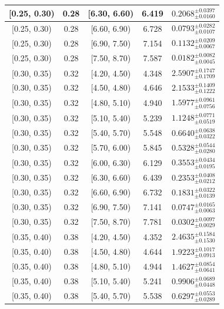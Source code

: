 \begin{longtable}{|c|c|c|c|c|}
\hline
[0.25, 0.30) & 0.28 & [6.30, 6.60) & 6.419 & $0.2068^{ \pm 0.0397 }_{ \pm 0.0160 }$ \\ 
\hline
[0.25, 0.30) & 0.28 & [6.60, 6.90) & 6.728 & $0.0793^{ \pm 0.0282 }_{ \pm 0.0107 }$ \\ 
\hline
[0.25, 0.30) & 0.28 & [6.90, 7.50) & 7.154 & $0.1132^{ \pm 0.0209 }_{ \pm 0.0067 }$ \\ 
\hline
[0.25, 0.30) & 0.28 & [7.50, 8.70) & 7.587 & $0.0182^{ \pm 0.0082 }_{ \pm 0.0045 }$ \\ 
\hline
[0.30, 0.35) & 0.32 & [4.20, 4.50) & 4.348 & $2.5907^{ \pm 0.1747 }_{ \pm 0.1709 }$ \\ 
\hline
[0.30, 0.35) & 0.32 & [4.50, 4.80) & 4.646 & $2.1533^{ \pm 0.1409 }_{ \pm 0.1222 }$ \\ 
\hline
[0.30, 0.35) & 0.32 & [4.80, 5.10) & 4.940 & $1.5977^{ \pm 0.0961 }_{ \pm 0.0756 }$ \\ 
\hline
[0.30, 0.35) & 0.32 & [5.10, 5.40) & 5.239 & $1.1248^{ \pm 0.0771 }_{ \pm 0.0519 }$ \\ 
\hline
[0.30, 0.35) & 0.32 & [5.40, 5.70) & 5.548 & $0.6640^{ \pm 0.0638 }_{ \pm 0.0322 }$ \\ 
\hline
[0.30, 0.35) & 0.32 & [5.70, 6.00) & 5.845 & $0.5328^{ \pm 0.0544 }_{ \pm 0.0280 }$ \\ 
\hline
[0.30, 0.35) & 0.32 & [6.00, 6.30) & 6.129 & $0.3553^{ \pm 0.0434 }_{ \pm 0.0195 }$ \\ 
\hline
[0.30, 0.35) & 0.32 & [6.30, 6.60) & 6.439 & $0.2353^{ \pm 0.0408 }_{ \pm 0.0212 }$ \\ 
\hline
[0.30, 0.35) & 0.32 & [6.60, 6.90) & 6.732 & $0.1831^{ \pm 0.0322 }_{ \pm 0.0139 }$ \\ 
\hline
[0.30, 0.35) & 0.32 & [6.90, 7.50) & 7.141 & $0.0747^{ \pm 0.0165 }_{ \pm 0.0063 }$ \\ 
\hline
[0.30, 0.35) & 0.32 & [7.50, 8.70) & 7.781 & $0.0302^{ \pm 0.0097 }_{ \pm 0.0029 }$ \\ 
\hline
[0.35, 0.40) & 0.38 & [4.20, 4.50) & 4.352 & $2.4635^{ \pm 0.1584 }_{ \pm 0.1530 }$ \\ 
\hline
[0.35, 0.40) & 0.38 & [4.50, 4.80) & 4.644 & $1.9223^{ \pm 0.1017 }_{ \pm 0.0913 }$ \\ 
\hline
[0.35, 0.40) & 0.38 & [4.80, 5.10) & 4.944 & $1.4627^{ \pm 0.0854 }_{ \pm 0.0641 }$ \\ 
\hline
[0.35, 0.40) & 0.38 & [5.10, 5.40) & 5.241 & $0.9906^{ \pm 0.0689 }_{ \pm 0.0448 }$ \\ 
\hline
[0.35, 0.40) & 0.38 & [5.40, 5.70) & 5.538 & $0.6297^{ \pm 0.0553 }_{ \pm 0.0289 }$ \\ 

\end{longtable}
